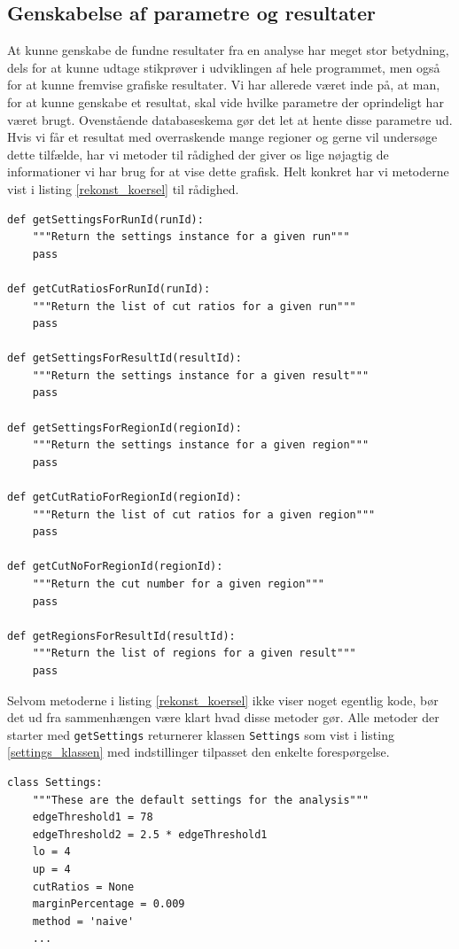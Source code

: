 {

\subsection{Genskabelse af parametre og resultater}
At kunne genskabe de fundne resultater fra en analyse har meget stor
betydning, dels for at kunne udtage stikprøver i udviklingen af hele
programmet, men også for at kunne fremvise grafiske resultater. Vi har
allerede været inde på, at man, for at kunne genskabe et resultat, skal
vide hvilke parametre der oprindeligt har været brugt. Ovenstående
databaseskema gør det let at hente disse parametre ud. Hvis vi får et
resultat med overraskende mange regioner og gerne vil undersøge dette
tilfælde, har vi metoder til rådighed der giver os lige nøjagtig de
informationer vi har brug for at vise dette grafisk. Helt konkret har vi
metoderne vist i listing \ref{rekonst_koersel} til rådighed.

\vspace{0.5cm}
\begin{lstlisting}[caption={Metoder til rekonstruktion af kørsler},captionpos=b,label={rekonst_koersel},numbers=none]
def getSettingsForRunId(runId):
    """Return the settings instance for a given run"""
    pass

def getCutRatiosForRunId(runId):
    """Return the list of cut ratios for a given run"""
    pass

def getSettingsForResultId(resultId):
    """Return the settings instance for a given result"""
    pass

def getSettingsForRegionId(regionId):
    """Return the settings instance for a given region"""
    pass

def getCutRatioForRegionId(regionId):
    """Return the list of cut ratios for a given region"""
    pass

def getCutNoForRegionId(regionId):
    """Return the cut number for a given region"""
    pass

def getRegionsForResultId(resultId):
    """Return the list of regions for a given result"""
    pass
\end{lstlisting}

Selvom metoderne i listing \ref{rekonst_koersel} ikke viser noget
egentlig kode, bør det ud fra sammenhængen være klart hvad disse metoder
gør. Alle metoder der starter med \texttt{getSettings} returnerer
klassen \texttt{Settings} som vist i listing \ref{settings_klassen} med
indstillinger tilpasset den enkelte forespørgelse.
\vspace{0.5cm}
\begin{lstlisting}[caption={Settings-klassen med standardindstillinger},captionpos=b,label={settings_klassen},numbers=none]
class Settings:
    """These are the default settings for the analysis"""
    edgeThreshold1 = 78
    edgeThreshold2 = 2.5 * edgeThreshold1
    lo = 4
    up = 4
    cutRatios = None
    marginPercentage = 0.009
    method = 'naive'
    ...
\end{lstlisting}

}
